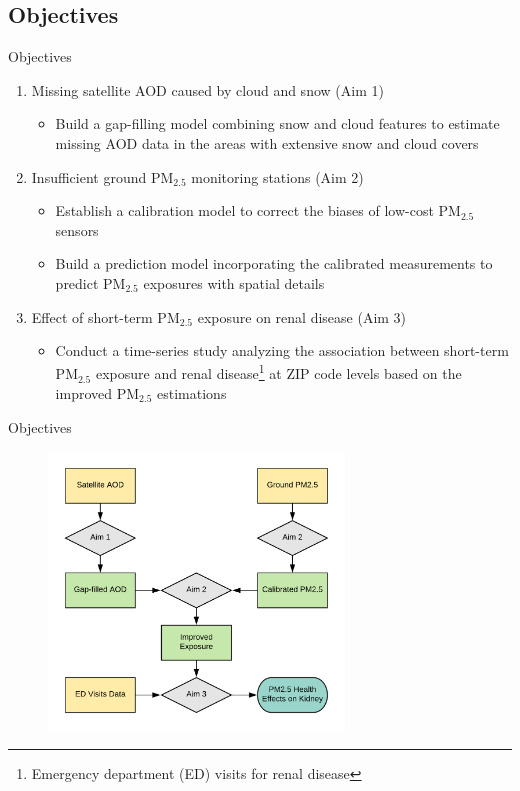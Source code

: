 \documentclass[handout]{beamer} %
\begin{document}
\subsection{Objectives}
\begin{frame}{Objectives}
    \begin{enumerate}
        \item<1> Missing satellite AOD caused by cloud and snow (Aim 1)
            \begin{itemize}
                \item \textcolor[rgb]{0.1,0.1,0.6}{Build a gap-filling model combining snow and cloud features to estimate missing AOD data in the areas with extensive snow and cloud covers}
            \end{itemize}
        \item<2> Insufficient ground PM$_{2.5}$ monitoring stations (Aim 2)
            \begin{itemize}
                \item \textcolor[rgb]{0.1,0.1,0.6}{Establish a calibration model to correct the biases of low-cost PM$_{2.5}$ sensors}
                \item \textcolor[rgb]{0.1,0.1,0.6}{Build a prediction model incorporating the calibrated measurements to predict PM$_{2.5}$ exposures with spatial details}
            \end{itemize}
        \item<3> Effect of short-term PM$_{2.5}$ exposure on renal disease (Aim 3)
            \begin{itemize}
                \item \textcolor[rgb]{0.1,0.1,0.6}{Conduct a time-series study analyzing the association between short-term PM$_{2.5}$ exposure and renal disease\footnote{Emergency department (ED) visits for renal disease} at ZIP code levels based on the improved PM$_{2.5}$ estimations}
            \end{itemize}
    \end{enumerate}
\end{frame}

\begin{frame}{Objectives}
    \begin{figure}
        \centering
        \includegraphics[width=0.7\textwidth]{img/flow.png}
    \end{figure}
\end{frame}
\end{document}
